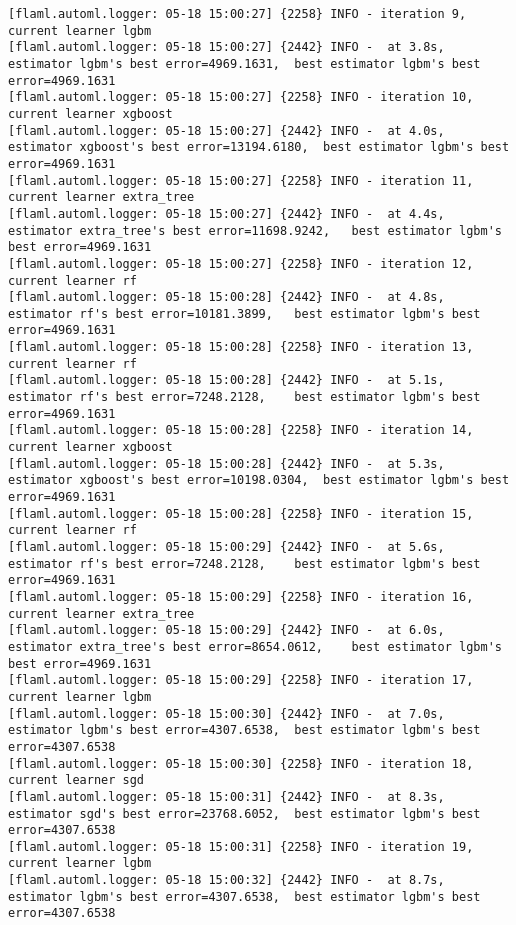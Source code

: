 \documentclass[
  letterpaper,
  DIV=11,
  numbers=noendperiod]{scrreprt}
\begin{document}
\begin{verbatim}
[flaml.automl.logger: 05-18 15:00:27] {2258} INFO - iteration 9, current learner lgbm
[flaml.automl.logger: 05-18 15:00:27] {2442} INFO -  at 3.8s,   estimator lgbm's best error=4969.1631,  best estimator lgbm's best error=4969.1631
[flaml.automl.logger: 05-18 15:00:27] {2258} INFO - iteration 10, current learner xgboost
[flaml.automl.logger: 05-18 15:00:27] {2442} INFO -  at 4.0s,   estimator xgboost's best error=13194.6180,  best estimator lgbm's best error=4969.1631
[flaml.automl.logger: 05-18 15:00:27] {2258} INFO - iteration 11, current learner extra_tree
[flaml.automl.logger: 05-18 15:00:27] {2442} INFO -  at 4.4s,   estimator extra_tree's best error=11698.9242,   best estimator lgbm's best error=4969.1631
[flaml.automl.logger: 05-18 15:00:27] {2258} INFO - iteration 12, current learner rf
[flaml.automl.logger: 05-18 15:00:28] {2442} INFO -  at 4.8s,   estimator rf's best error=10181.3899,   best estimator lgbm's best error=4969.1631
[flaml.automl.logger: 05-18 15:00:28] {2258} INFO - iteration 13, current learner rf
[flaml.automl.logger: 05-18 15:00:28] {2442} INFO -  at 5.1s,   estimator rf's best error=7248.2128,    best estimator lgbm's best error=4969.1631
[flaml.automl.logger: 05-18 15:00:28] {2258} INFO - iteration 14, current learner xgboost
[flaml.automl.logger: 05-18 15:00:28] {2442} INFO -  at 5.3s,   estimator xgboost's best error=10198.0304,  best estimator lgbm's best error=4969.1631
[flaml.automl.logger: 05-18 15:00:28] {2258} INFO - iteration 15, current learner rf
[flaml.automl.logger: 05-18 15:00:29] {2442} INFO -  at 5.6s,   estimator rf's best error=7248.2128,    best estimator lgbm's best error=4969.1631
[flaml.automl.logger: 05-18 15:00:29] {2258} INFO - iteration 16, current learner extra_tree
[flaml.automl.logger: 05-18 15:00:29] {2442} INFO -  at 6.0s,   estimator extra_tree's best error=8654.0612,    best estimator lgbm's best error=4969.1631
[flaml.automl.logger: 05-18 15:00:29] {2258} INFO - iteration 17, current learner lgbm
[flaml.automl.logger: 05-18 15:00:30] {2442} INFO -  at 7.0s,   estimator lgbm's best error=4307.6538,  best estimator lgbm's best error=4307.6538
[flaml.automl.logger: 05-18 15:00:30] {2258} INFO - iteration 18, current learner sgd
[flaml.automl.logger: 05-18 15:00:31] {2442} INFO -  at 8.3s,   estimator sgd's best error=23768.6052,  best estimator lgbm's best error=4307.6538
[flaml.automl.logger: 05-18 15:00:31] {2258} INFO - iteration 19, current learner lgbm
[flaml.automl.logger: 05-18 15:00:32] {2442} INFO -  at 8.7s,   estimator lgbm's best error=4307.6538,  best estimator lgbm's best error=4307.6538

\end{verbatim}
\end{document}
